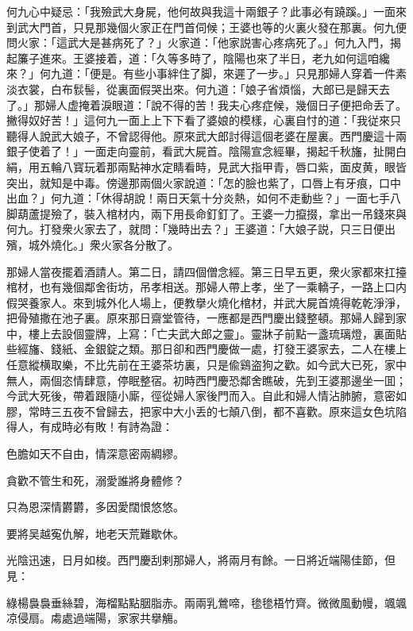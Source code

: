 何九心中疑忌：「我殮武大身屍，他何故與我這十兩銀子？此事必有蹺蹊。」一面來到武大門首，只見那幾個火家正在門首伺候；王婆也等的火裏火發在那裏。何九便問火家：「這武大是甚病死了？」火家道：「他家説害心疼病死了。」何九入門，揭起簾子進來。王婆接着，道：「久等多時了，陰陽也來了半日，老九如何這咱纔來？」何九道：「便是。有些小事絆住了脚，來遲了一步。」只見那婦人穿着一件素淡衣裳，白布䯼髻，從裏面假哭出來。何九道：「娘子省煩惱，大郎已是歸天去了。」那婦人虚掩着淚眼道：「說不得的苦！我夫心疼症候，幾個日子便把命丢了。撇得奴好苦！」這何九一面上上下下看了婆娘的模樣，心裏自忖的道：「我従來只聽得人說武大娘子，不曾認得他。原來武大郎討得這個老婆在屋裏。西門慶這十兩銀子使着了！」一面走向靈前，看武大屍首。陰陽宣念經畢，揭起千秋旛，扯開白絹，用五輪八寳玩着那兩點神水定睛看時，見武大指甲青，唇口紫，面皮黄，眼皆突出，就知是中毒。傍邊那兩個火家說道：「怎的臉也紫了，口唇上有牙痕，口中出血？」何九道：「休得胡說！兩日天氣十分炎熱，如何不走動些？」一面七手八脚葫蘆提殮了，裝入棺材内，兩下用長命釘釘了。王婆一力攛掇，拿出一吊錢來與何九。打發衆火家去了，就問：「幾時出去？」王婆道：「大娘子説，只三日便出殯，城外燒化。」衆火家各分散了。

那婦人當夜擺着酒請人。第二日，請四個僧念經。第三日早五更，衆火家都來扛擡棺材，也有幾個鄰舍街坊，吊孝相送。那婦人帶上孝，坐了一乘轎子，一路上口内假哭養家人。來到城外化人場上，便教擧火燒化棺材，并武大屍首燒得乾乾淨淨，把骨殖撒在池子裏。原來那日齋堂管待，一應都是西門慶出錢整頓。那婦人歸到家中，樓上去設個靈牌，上寫：「亡夫武大郎之靈」。靈牀子前點一盞琉璃燈，裏面貼些經旛、錢紙、金銀錠之類。那日卻和西門慶做一處，打發王婆家去，二人在樓上任意縱横取樂，不比先前在王婆茶坊裏，只是偸鷄盗狗之歡。如今武大已死，家中無人，兩個恣情肆意，停眠整宿。初時西門慶恐鄰舍瞧破，先到王婆那邊坐一囬；今武大死後，帶着跟隨小廝，徑從婦人家後門而入。自此和婦人情沾肺腑，意密如膠，常時三五夜不曾歸去，把家中大小丢的七顛八倒，都不喜歡。原來這女色坑陷得人，有成時必有敗！有詩為證：

\begin{myquote}
色膽如天不自由，情深意密兩綢繆。

貪歡不管生和死，溺愛誰將身體修？

只為恩深情欝欝，多因愛闊恨悠悠。

要將吴越寃仇解，地老天荒難歇休。
\end{myquote}

光陰迅速，日月如梭。西門慶刮剌那婦人，將兩月有餘。一日將近端陽佳節，但見：
\begin{myquote}
綠楊裊裊垂絲碧，海榴點點胭脂赤。兩兩乳鶯啼，毶毶梧竹齊。微微風動幔，颯颯凉侵扇。䖏處過端陽，家家共擧觴。
\end{myquote}

